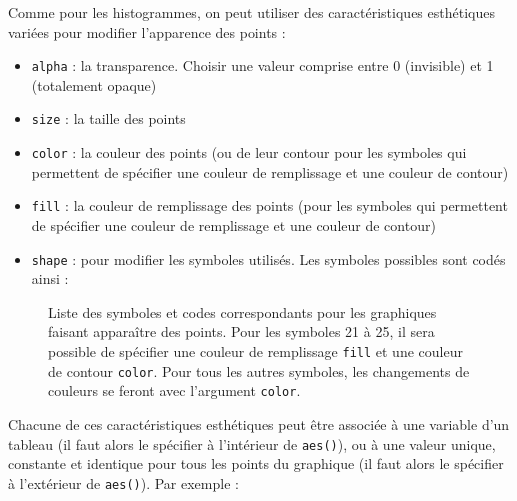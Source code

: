 \documentclass[
  a4paper,
  DIV=11,
  numbers=noendperiod,
  oneside]{scrreprt}
\providecommand{\tightlist}{%
  \setlength{\itemsep}{0pt}\setlength{\parskip}{0pt}}\usepackage{longtable,booktabs,array}
\begin{document}
Comme pour les histogrammes, on peut utiliser des caractéristiques
esthétiques variées pour modifier l'apparence des points :

\begin{itemize}
\tightlist
\item
  \texttt{alpha} : la transparence. Choisir une valeur comprise entre 0
  (invisible) et 1 (totalement opaque)
\item
  \texttt{size} : la taille des points
\item
  \texttt{color} : la couleur des points (ou de leur contour pour les
  symboles qui permettent de spécifier une couleur de remplissage et une
  couleur de contour)
\item
  \texttt{fill} : la couleur de remplissage des points (pour les
  symboles qui permettent de spécifier une couleur de remplissage et une
  couleur de contour)
\item
  \texttt{shape} : pour modifier les symboles utilisés. Les symboles
  possibles sont codés ainsi :
\end{itemize}

\begin{figure}


\caption{\label{fig-pch}Liste des symboles et codes correspondants pour
les graphiques faisant apparaître des points. Pour les symboles 21 à 25,
il sera possible de spécifier une couleur de remplissage \texttt{fill}
et une couleur de contour \texttt{color}. Pour tous les autres symboles,
les changements de couleurs se feront avec l'argument \texttt{color}.}

\end{figure}%

Chacune de ces caractéristiques esthétiques peut être associée à une
variable d'un tableau (il faut alors le spécifier à l'intérieur de
\texttt{aes()}), ou à une valeur unique, constante et identique pour
tous les points du graphique (il faut alors le spécifier à l'extérieur
de \texttt{aes()}). Par exemple :
\end{document}
